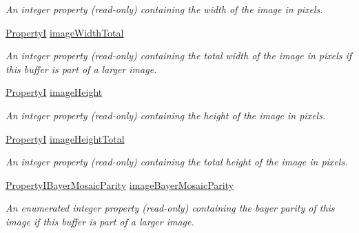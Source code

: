 \begin{DoxyCompactItemize}
\begin{DoxyCompactList}\small\item\em An integer property {\bfseries }(read-\/only) containing the width of the image in pixels. \end{DoxyCompactList}\item 
\hyperlink{group___common_interface_ga12d5e434238ca242a1ba4c6c3ea45780}{Property\+I} \hyperlink{classmv_i_m_p_a_c_t_1_1acquire_1_1_request_a7a509bd410685fe447196c821db0926e}{image\+Width\+Total}
\begin{DoxyCompactList}\small\item\em An integer property {\bfseries }(read-\/only) containing the total width of the image in pixels if this buffer is part of a larger image. \end{DoxyCompactList}\item 
\hypertarget{classmv_i_m_p_a_c_t_1_1acquire_1_1_request_af7654539fb5277dec6f7b59fa428354f}{\hyperlink{group___common_interface_ga12d5e434238ca242a1ba4c6c3ea45780}{Property\+I} \hyperlink{classmv_i_m_p_a_c_t_1_1acquire_1_1_request_af7654539fb5277dec6f7b59fa428354f}{image\+Height}}\label{classmv_i_m_p_a_c_t_1_1acquire_1_1_request_af7654539fb5277dec6f7b59fa428354f}

\begin{DoxyCompactList}\small\item\em An integer property {\bfseries }(read-\/only) containing the height of the image in pixels. \end{DoxyCompactList}\item 
\hyperlink{group___common_interface_ga12d5e434238ca242a1ba4c6c3ea45780}{Property\+I} \hyperlink{classmv_i_m_p_a_c_t_1_1acquire_1_1_request_a84c5b14d9856295065bdd4efa2371484}{image\+Height\+Total}
\begin{DoxyCompactList}\small\item\em An integer property {\bfseries }(read-\/only) containing the total height of the image in pixels. \end{DoxyCompactList}\item 
\hyperlink{group___common_interface_gafaa3668c30761b139d7ff110ac2c83e4}{Property\+I\+Bayer\+Mosaic\+Parity} \hyperlink{classmv_i_m_p_a_c_t_1_1acquire_1_1_request_a4db5758c23b9167a1af7da2f9829289a}{image\+Bayer\+Mosaic\+Parity}
\begin{DoxyCompactList}\small\item\em An enumerated integer property {\bfseries }(read-\/only) containing the bayer parity of this image if this buffer is part of a larger image. \end{DoxyCompactList}\end{DoxyCompactItemize}
